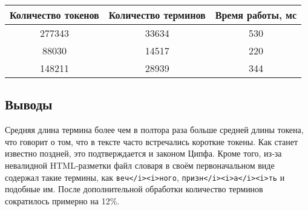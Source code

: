 \documentclass[a4paper, 12pt]{article}
\begin{document}
\begin{tabular}{|c|c|c|}
\hline
Количество токенов & Количество терминов & Время работы, мс \\
\hline
277343 & 33634 & 530 \\
88030 & 14517 & 220 \\
148211 & 28939 & 344 \\
\hline
\end{tabular}

\vspace{1cm}


\subsection*{Выводы}
Средняя длина термина более чем в полтора раза больше средней длины токена, что говорит о том, что в тексте часто встречались короткие токены. Как станет известно поздней, это подтверждается и законом Ципфа. Кроме того, из-за невалидной HTML-разметки файл словаря в своём первоначальном виде содержал такие термины, как {\tt веч</i><i>ного}, {\tt призн</i><i>а</i><i>ть} и подобные им. После дополнительной обработки количество терминов сократилось примерно на 12\%.
\end{document}
